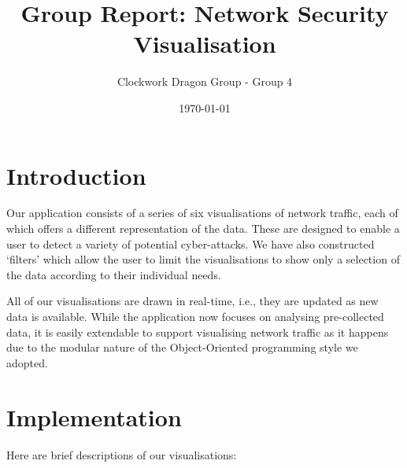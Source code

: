 \documentclass[12pt,a4paper]{article}
\author{Clockwork Dragon Group - Group 4}
\title{Group Report: Network Security Visualisation}
\date{\today}
\begin{document}
	
	\maketitle

    \section*{Introduction}
	Our application consists of a series of six visualisations of network traffic, each of which offers a different representation of the data. These are designed to enable a user to detect a variety of potential cyber-attacks. 
			We have also constructed `filters' which allow the user to limit the visualisations to show only a selection of the data according to their individual needs. 
			
			All of our visualisations are drawn in real-time, i.e., they are updated as new data is available. While the application now focuses on analysing pre-collected data, it is easily extendable to support visualising network traffic as it happens due to the modular nature of the Object-Oriented programming style we adopted.

    \section*{Implementation}
			Here are brief descriptions of our visualisations:
			
\end{document}
